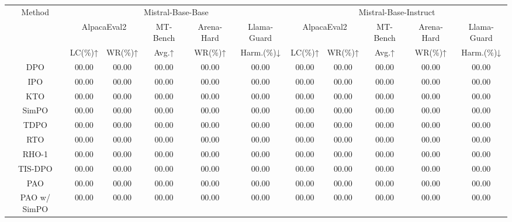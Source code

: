 \begin{table}[]
\setlength{\tabcolsep}{1.5pt}
\small
\begin{tabular}{cccccc|ccccc}
\hline
\multirow{3}{*}{Method} & \multicolumn{5}{c|}{Mistral-Base-Base}                                 & \multicolumn{5}{c}{Mistral-Base-Instruct}                                  \\ \cline{2-11} 
                        & \multicolumn{2}{c}{AlpacaEval2} & MT-Bench & Arena-Hard & Llama-Guard & \multicolumn{2}{c}{AlpacaEval2} & MT-Bench & Arena-Hard & Llama-Guard \\ \cline{2-11} 
                        & LC(\%)↑        & WR(\%)↑        & Avg.↑    & WR(\%)↑    & Harm.(\%)↓  & LC(\%)↑        & WR(\%)↑        & Avg.↑    & WR(\%)↑    & Harm.(\%)↓  \\ \hline
DPO                     & 00.00          & 00.00          & 00.00    & 00.00      & 00.00       & 00.00          & 00.00          & 00.00    & 00.00      & 00.00       \\
IPO                     & 00.00          & 00.00          & 00.00    & 00.00      & 00.00       & 00.00          & 00.00          & 00.00    & 00.00      & 00.00       \\
KTO                     & 00.00          & 00.00          & 00.00    & 00.00      & 00.00       & 00.00          & 00.00          & 00.00    & 00.00      & 00.00       \\
SimPO                   & 00.00          & 00.00          & 00.00    & 00.00      & 00.00       & 00.00          & 00.00          & 00.00    & 00.00      & 00.00       \\
TDPO                    & 00.00          & 00.00          & 00.00    & 00.00      & 00.00       & 00.00          & 00.00          & 00.00    & 00.00      & 00.00       \\
RTO                     & 00.00          & 00.00          & 00.00    & 00.00      & 00.00       & 00.00          & 00.00          & 00.00    & 00.00      & 00.00       \\
RHO-1                   & 00.00          & 00.00          & 00.00    & 00.00      & 00.00       & 00.00          & 00.00          & 00.00    & 00.00      & 00.00       \\
TIS-DPO                 & 00.00          & 00.00          & 00.00    & 00.00      & 00.00       & 00.00          & 00.00          & 00.00    & 00.00      & 00.00       \\
\hline
PAO                     & 00.00          & 00.00          & 00.00    & 00.00      & 00.00       & 00.00          & 00.00          & 00.00    & 00.00      & 00.00       \\
PAO w/ SimPO            & 00.00          & 00.00          & 00.00    & 00.00      & 00.00       & 00.00          & 00.00          & 00.00    & 00.00      & 00.00       \\ \hline
\end{tabular}
\end{table}